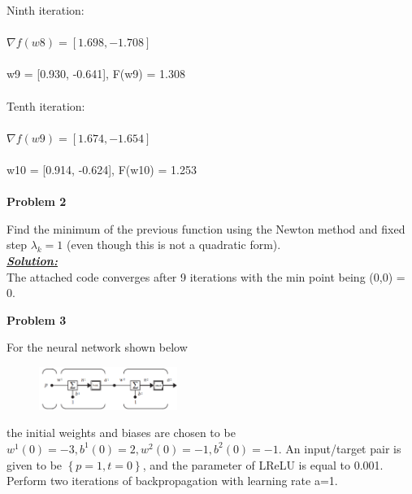 \documentclass{article}
\begin{document}
\noindent Ninth iteration: \\ \\
$\nabla f(w8)= [1.698,-1.708]$ \\ \\
w9 = [0.930, -0.641], F(w9) = 1.308 \\ \\

\noindent Tenth iteration: \\ \\
$\nabla f(w9)= [1.674,-1.654]$ \\ \\
w10 = [0.914, -0.624], F(w10) = 1.253 \\ \\







\vspace {2cm}
\noindent \textbf{Problem 2}

\noindent Find the minimum of the previous function using the Newton method and fixed step $ \lambda_k = 1$ (even though this is not a quadratic form). \\

\noindent \underline{\textbf{\textit{Solution:}}} \\ 

\noindent The attached code converges after 9 iterations with the min point being (0,0) = 0.



\newpage
\noindent \textbf{Problem 3}

\noindent For the neural network shown below

\begin{figure}[h]
  \centering
  \includegraphics[width=0.4\textwidth]{pr3_a.png}
  
\end{figure}

\noindent the initial weights and biases are chosen to be $w^1(0) = -3, b^1(0) = 2, w^2(0) = -1, b^2(0) = -1$. An input/target pair is given to be ${\left \{p = 1, t=0 \right \} }$, and the parameter of LReLU is equal to 0.001. Perform two iterations of backpropagation with learning rate a=1.  \\ \\ \\
\end{document}
